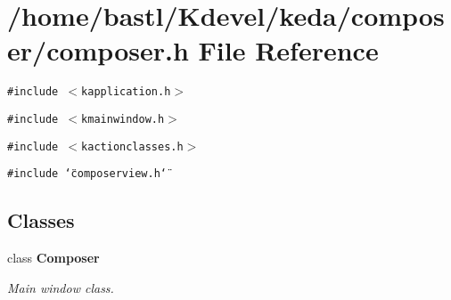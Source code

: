 \section{/home/bastl/Kdevel/keda/composer/composer.h File Reference}
\label{composer_8h}
{\tt \#include $<$kapplication.h$>$}\par
{\tt \#include $<$kmainwindow.h$>$}\par
{\tt \#include $<$kactionclasses.h$>$}\par
{\tt \#include \char`\"{}composerview.h\char`\"{}}\par
\subsection*{Classes}
\begin{CompactItemize}
\item 
class {\bf Composer}
\begin{CompactList}\small\item\em Main window class. \item\end{CompactList}\end{CompactItemize}
